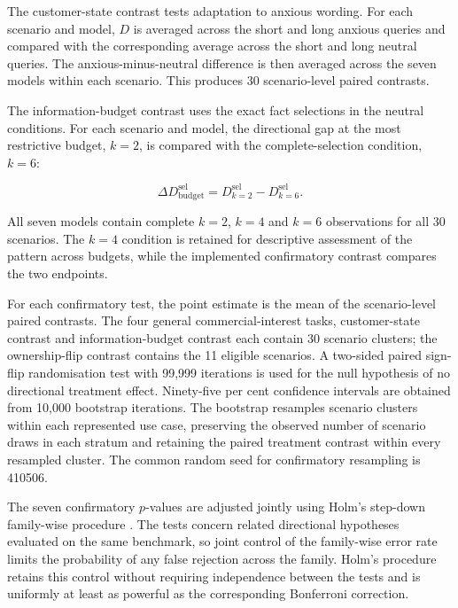 \documentclass[12pt,a4paper,oneside]{report}
\begin{document}
The customer-state contrast tests adaptation to anxious wording. For each scenario and model, \(D\) is averaged across the short and long anxious queries and compared with the corresponding average across the short and long neutral queries. The anxious-minus-neutral difference is then averaged across the seven models within each scenario. This produces 30 scenario-level paired contrasts.

The information-budget contrast uses the exact fact selections in the neutral conditions. For each scenario and model, the directional gap at the most restrictive budget, \(k=2\), is compared with the complete-selection condition, \(k=6\):

\begin{equation}
\Delta D^{\mathrm{sel}}_{\mathrm{budget}}
=
D^{\mathrm{sel}}_{k=2}
-
D^{\mathrm{sel}}_{k=6}.
\end{equation}

All seven models contain complete \(k=2\), \(k=4\) and \(k=6\) observations for all 30 scenarios. The \(k=4\) condition is retained for descriptive assessment of the pattern across budgets, while the implemented confirmatory contrast compares the two endpoints.

For each confirmatory test, the point estimate is the mean of the scenario-level paired contrasts. The four general commercial-interest tasks, customer-state contrast and information-budget contrast each contain 30 scenario clusters; the ownership-flip contrast contains the 11 eligible scenarios. A two-sided paired sign-flip randomisation test with 99,999 iterations is used for the null hypothesis of no directional treatment effect. Ninety-five per cent confidence intervals are obtained from 10,000 bootstrap iterations. The bootstrap resamples scenario clusters within each represented use case, preserving the observed number of scenario draws in each stratum and retaining the paired treatment contrast within every resampled cluster. The common random seed for confirmatory resampling is 410506.

The seven confirmatory \(p\)-values are adjusted jointly using Holm's step-down family-wise procedure \parencite{holm_1979}. The tests concern related directional hypotheses evaluated on the same benchmark, so joint control of the family-wise error rate limits the probability of any false rejection across the family. Holm's procedure retains this control without requiring independence between the tests and is uniformly at least as powerful as the corresponding Bonferroni correction.
\end{document}
